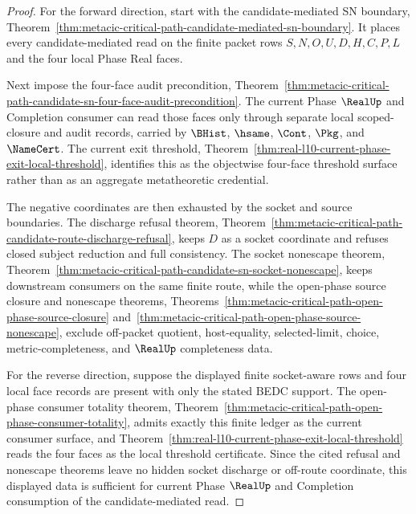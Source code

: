 \begin{proof}
For the forward direction, start with the candidate-mediated SN boundary, Theorem~\ref{thm:metacic-critical-path-candidate-mediated-sn-boundary}. It places every candidate-mediated read on the finite packet rows $S,N,O,U,D,H,C,P,L$ and the four local Phase Real faces.

Next impose the four-face audit precondition, Theorem~\ref{thm:metacic-critical-path-candidate-sn-four-face-audit-precondition}. The current Phase $\RealUp$ and Completion consumer can read those faces only through separate local scoped-closure and audit records, carried by $\BHist$, $\hsame$, $\Cont$, $\Pkg$, and $\NameCert$. The current exit threshold, Theorem~\ref{thm:real-l10-current-phase-exit-local-threshold}, identifies this as the objectwise four-face threshold surface rather than as an aggregate metatheoretic credential.

The negative coordinates are then exhausted by the socket and source boundaries. The discharge refusal theorem, Theorem~\ref{thm:metacic-critical-path-candidate-route-discharge-refusal}, keeps $D$ as a socket coordinate and refuses closed subject reduction and full consistency. The socket nonescape theorem, Theorem~\ref{thm:metacic-critical-path-candidate-sn-socket-nonescape}, keeps downstream consumers on the same finite route, while the open-phase source closure and nonescape theorems, Theorems~\ref{thm:metacic-critical-path-open-phase-source-closure} and~\ref{thm:metacic-critical-path-open-phase-source-nonescape}, exclude off-packet quotient, host-equality, selected-limit, choice, metric-completeness, and $\RealUp$ completeness data.

For the reverse direction, suppose the displayed finite socket-aware rows and four local face records are present with only the stated BEDC support. The open-phase consumer totality theorem, Theorem~\ref{thm:metacic-critical-path-open-phase-consumer-totality}, admits exactly this finite ledger as the current consumer surface, and Theorem~\ref{thm:real-l10-current-phase-exit-local-threshold} reads the four faces as the local threshold certificate. Since the cited refusal and nonescape theorems leave no hidden socket discharge or off-route coordinate, this displayed data is sufficient for current Phase $\RealUp$ and Completion consumption of the candidate-mediated read.
\end{proof}

